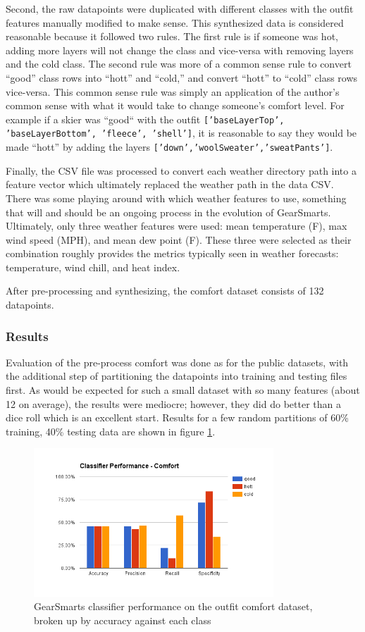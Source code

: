 Second, the raw datapoints were duplicated with different classes with the outfit features manually modified to make sense.
This synthesized data is considered reasonable because it followed two rules. The first rule is if someone was hot, adding
more layers will not change the class and vice-versa with removing layers and the cold class. The second rule was more of a
common sense rule to convert ``good'' class rows into ``hott'' and ``cold,'' and convert ``hott'' to ``cold'' class rows
vice-versa. This common sense rule was simply an application of the author's common sense with what it would take to
change someone's comfort level. For example if a skier was ``good`` with the outfit \texttt{['baseLayerTop', 'baseLayerBottom', 'fleece', 'shell']},
it is reasonable to say they would be made ``hott'' by adding the layers \texttt{['down','woolSweater','sweatPants']}.

Finally, the CSV file was processed to convert each weather directory path into a feature vector which ultimately replaced the
weather path in the data CSV. There was some playing around with which weather features to use, something that will and should
be an ongoing process in the evolution of GearSmarts. Ultimately, only three weather features were used: mean temperature (F),
max wind speed (MPH), and mean dew point (F). These three were selected as their combination roughly provides the metrics
typically seen in weather forecasts: temperature, wind chill, and heat index.

After pre-processing and synthesizing, the comfort dataset consists of 132 datapoints.

\subsubsection{Results}
\label{subsection:preprocessing}
Evaluation of the pre-process comfort was done as for the public datasets, with the additional step of partitioning the
datapoints into training and testing files first. As would be expected for such a small dataset with so many features
(about 12 on average), the results were mediocre; however, they did do better than a dice roll which is an excellent start.
Results for a few random partitions of 60\% training, 40\% testing data are shown in figure \ref{fig:comfort}.

\begin{figure}[ht!]
    \centering
    \includegraphics[width=90mm]{img/comfort.png}
    \caption{GearSmarts classifier performance on the outfit comfort dataset, broken up by accuracy against each class}
    \label{fig:comfort}
\end{figure}
